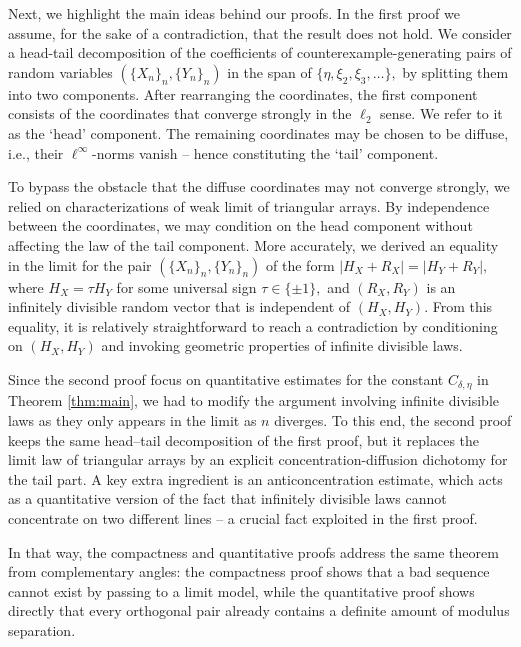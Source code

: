 \documentclass[11pt]{amsart}
\numberwithin{equation}{section}
\theoremstyle{definition}
\theoremstyle{remark}
\begin{document}
Next, we highlight the main ideas behind our proofs. In the first proof we assume, for the sake of a contradiction, that the result does not hold.  We consider a head-tail decomposition of the coefficients of counterexample-generating pairs of random variables $(\{X_n\}_n, \{Y_n\}_n)$ in the span of $\{\eta,\xi_2,\xi_3,\dots\},$ by splitting them into two components. After rearranging the coordinates, the first component consists of the coordinates that converge strongly in the $\ell_2$ sense. We refer to it as the `head' component. The remaining coordinates may be chosen to be diffuse, i.e., their $\ell^{\infty}$-norms vanish -- hence constituting the `tail' component. 

To bypass the obstacle that the diffuse coordinates may not converge strongly, we relied on characterizations of weak limit of triangular arrays. By independence between the coordinates, we may condition on the head component without affecting the law of the tail component. More accurately, we  derived an equality in the limit for the pair $(\{X_n\}_n, \{Y_n\}_n)$ of the form $|H_X + R_X| = |H_Y + R_Y|,$ where $H_X = \tau H_Y$ for some universal sign $\tau \in \{\pm1\},$ and $(R_X,R_Y)$ is an infinitely divisible random vector that is  independent of $(H_X,H_Y)$. From this equality, it is relatively straightforward to reach a contradiction by conditioning on $(H_X,H_Y)$ and invoking geometric properties of infinite divisible laws.

Since the second proof focus on quantitative estimates for the constant $C_{\delta,\eta}$ in Theorem \ref{thm:main}, we had to modify the argument involving infinite divisible laws as they only appears in the limit as $n$ diverges. To this end, the second proof keeps the same head--tail decomposition of the first proof, but it replaces the limit law of triangular arrays  by an
explicit concentration-diffusion dichotomy for the tail part. A key extra ingredient is an anticoncentration estimate, which acts as a quantitative version of the fact that infinitely divisible laws cannot concentrate on two different lines -- a crucial fact exploited in the first proof.

In that way, the compactness and quantitative proofs address
the same theorem from complementary angles: the compactness proof shows that a
bad sequence cannot exist by passing to a limit model, while the quantitative proof
shows directly that every orthogonal pair already contains a definite amount of
modulus separation.
\end{document}
